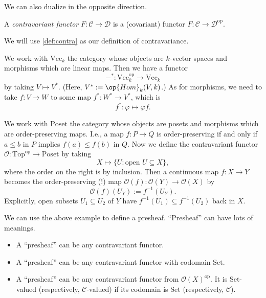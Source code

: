 \documentclass[../notes.tex]{subfiles}
\begin{document}
We can also dualize in the opposite direction.
\begin{definition}
	A \textit{contravariant functor} $F:\mathcal C\to\mathcal D$ is a (covariant) functor $F:\mathcal C\to\mathcal D^\mathrm{op}$.
\end{definition}
\begin{warn}
	We will use \autoref{def:contra} as our definition of contravariance.
\end{warn}
\begin{example}
	We work with $\mathrm{Vec}_k$ the category whose objects are $k$-vector spaces and morphisms which are linear maps. Then we have a functor
	\[-^*:\mathrm{Vec}_k^\mathrm{op}\to\mathrm{Vec}_k\]
	by taking $V\mapsto V^*$. (Here, $V^*:=\op{Hom}_k(V,k)$.) As for morphisms, we need to take $f:V\to W$ to some map $f^*:W^*\to V^*$, which is
	\[f^*:\varphi\mapsto\varphi f.\]
\end{example}
\begin{example}
	We work with $\mathrm{Poset}$ the category whose objects are posets and morphisms which are order-preserving maps. I.e., a map $f:P\to Q$ is order-preserving if and only if $a\le b$ in $P$ implies $f(a)\le f(b)$ in $Q$. Now we define the contravariant functor $\mathcal O:\mathrm{Top}^\mathrm{op}\to\mathrm{Poset}$ by taking
	\[X\mapsto\{U:\text{open }U\subseteq X\},\]
	where the order on the right is by inclusion. Then a continuous map $f:X\to Y$ becomes the order-preserving (!) map $\mathcal O(f):\mathcal O(Y)\to\mathcal O(X)$ by
	\[\mathcal O(f)(U_Y):=f^{-1}(U_Y).\]
	Explicitly, open subsets $U_1\subseteq U_2$ of $Y$ have $f^{-1}(U_1)\subseteq f^{-1}(U_2)$ back in $X$.
\end{example}
\begin{remark}
	We can use the above example to define a presheaf. ``Presheaf'' can have lots of meanings.
	\begin{itemize}
		\item A ``presheaf'' can be any contravariant functor.
		\item A ``presheaf'' can be any contravariant functor with codomain $\mathrm{Set}$.
		\item A ``presheaf'' can be any contravariant functor from $\mathcal O(X)^\mathrm{op}$. It is $\mathrm{Set}$-valued (respectively, $\mathcal C$-valued) if its codomain is $\mathrm{Set}$ (respectively, $\mathcal C$).
	\end{itemize}
\end{remark}
\end{document}
